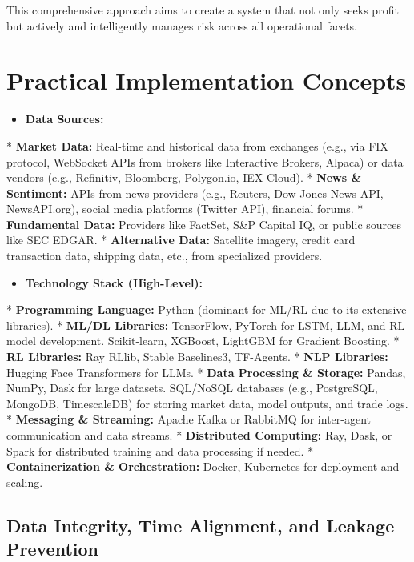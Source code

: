 \documentclass[11pt]{article}
\begin{document}
This comprehensive approach aims to create a system that not only seeks profit but actively and intelligently manages risk across all operational facets.

\section{Practical Implementation Concepts}

\begin{itemize}
\item   \textbf{Data Sources:}
\end{itemize}
    *   \textbf{Market Data:} Real-time and historical data from exchanges (e.g., via FIX protocol, WebSocket APIs from brokers like Interactive Brokers, Alpaca) or data vendors (e.g., Refinitiv, Bloomberg, Polygon.io, IEX Cloud).
    *   \textbf{News \& Sentiment:} APIs from news providers (e.g., Reuters, Dow Jones News API, NewsAPI.org), social media platforms (Twitter API), financial forums.
    *   \textbf{Fundamental Data:} Providers like FactSet, S\&P Capital IQ, or public sources like SEC EDGAR.
    *   \textbf{Alternative Data:} Satellite imagery, credit card transaction data, shipping data, etc., from specialized providers.

\begin{itemize}
\item   \textbf{Technology Stack (High-Level):}
\end{itemize}
    *   \textbf{Programming Language:} Python (dominant for ML/RL due to its extensive libraries).
    *   \textbf{ML/DL Libraries:} TensorFlow, PyTorch for LSTM, LLM, and RL model development. Scikit-learn, XGBoost, LightGBM for Gradient Boosting.
    *   \textbf{RL Libraries:} Ray RLlib, Stable Baselines3, TF-Agents.
    *   \textbf{NLP Libraries:} Hugging Face Transformers for LLMs.
    *   \textbf{Data Processing \& Storage:} Pandas, NumPy, Dask for large datasets. SQL/NoSQL databases (e.g., PostgreSQL, MongoDB, TimescaleDB) for storing market data, model outputs, and trade logs.
    *   \textbf{Messaging \& Streaming:} Apache Kafka or RabbitMQ for inter-agent communication and data streams.
    *   \textbf{Distributed Computing:} Ray, Dask, or Spark for distributed training and data processing if needed.
    *   \textbf{Containerization \& Orchestration:} Docker, Kubernetes for deployment and scaling.

\subsection{Data Integrity, Time Alignment, and Leakage Prevention}
\end{document}
